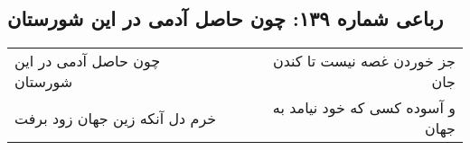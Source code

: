 \begin{center}
\section*{رباعی شماره ۱۳۹: چون حاصل آدمی در این شورستان}
\label{sec:sh139}
\begin{longtable}{l p{0.5cm} r}
چون حاصل آدمی در این شورستان
&&
جز خوردن غصه نیست تا کندن جان
\\
خرم دل آنکه زین جهان زود برفت
&&
و آسوده کسی که خود نیامد به جهان
\\
\end{longtable}
\end{center}
